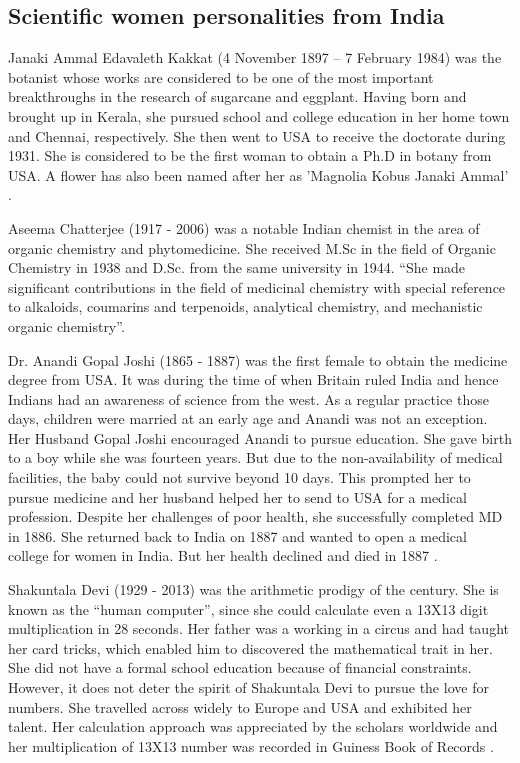 \documentclass[a4paper,10pt]{article}
\begin{document}
\subsection{Scientific women personalities from India}

\newblock
Janaki Ammal Edavaleth Kakkat (4 November 1897 – 7 February 1984) was the botanist whose works are considered to be one of the most important breakthroughs in the research of sugarcane and eggplant. Having born and brought up in Kerala, she pursued school and college education in her home town and Chennai, respectively. She then went to USA to receive the doctorate during 1931. She is considered to be the first woman to obtain a Ph.D in botany from USA. A flower has also been named after her as 'Magnolia Kobus Janaki Ammal' \cite{janaki}.

\newblock
Aseema Chatterjee (1917 - 2006) was a notable Indian chemist in the area of organic chemistry and phytomedicine. She received M.Sc in the field of Organic Chemistry in 1938 and D.Sc. from the same university in 1944. ``She made significant contributions in the field of medicinal chemistry with special reference to alkaloids, coumarins and terpenoids, analytical chemistry, and mechanistic organic chemistry''.  \cite{chaterjee}


\newblock
Dr. Anandi Gopal Joshi (1865 - 1887) was the first female to obtain the medicine degree from USA. It was during the time of when Britain ruled India and hence Indians had an awareness of science from the west. As a regular practice those days, children were married at an early age and Anandi was not an exception. Her Husband Gopal Joshi encouraged Anandi to pursue education. She gave birth to a boy while she was fourteen years. But due to the non-availability of medical facilities, the baby could not survive beyond 10 days. This prompted her to pursue medicine and her husband helped her to send to USA for a medical profession. Despite her challenges of poor health, she successfully completed MD in 1886. She returned back to India on 1887 and wanted to open a medical college for women in India. But her health declined and died in 1887  \cite{joshi}.

\newblock
Shakuntala Devi (1929 - 2013) was the arithmetic prodigy of the century. She is known as the ``human computer'', since she could calculate even a 13X13 digit multiplication in 28 seconds. Her father was a working in a circus and had taught her card tricks, which enabled him to discovered the mathematical trait in her. She did not have a formal school education because of financial constraints. However, it does not deter the spirit of Shakuntala Devi to pursue the love for numbers. She travelled across widely to Europe and USA and exhibited her talent. Her calculation approach was appreciated by the scholars worldwide and her multiplication of 13X13 number was recorded in Guiness Book of Records \cite{shakuntala}. 
\end{document}
